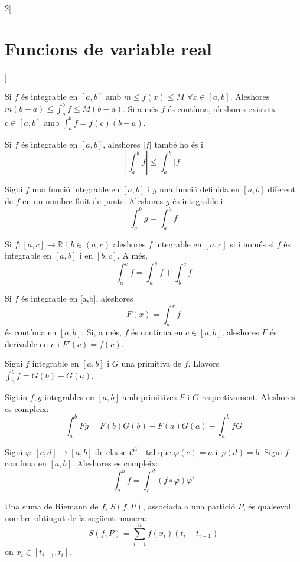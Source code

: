 \documentclass[class=article,10pt,crop=false]{standalone}
\begin{document}
\begin{multicols}{2}[\section{Funcions de variable real}]
\begin{prop}
\end{prop}
\begin{corollary}
Si $f$ és integrable en $[a,b]$ amb $m\leq f(x)\leq M$ $\forall x\in [a,b]$. Aleshores $m(b-a)\leq\int_a^bf\leq M(b-a)$. Si a més $f$ és contínua, aleshores existeix $c\in[a,b]$ amb $\int_a^bf=f(c)(b-a)$.
\end{corollary}
\begin{prop}
Si $f$ és integrable en $[a,b]$, aleshores $|f|$ també ho és i $$\left|\int_a^bf\right|\leq\int_a^b|f|$$
\end{prop}
\begin{prop}
Sigui $f$ una funció integrable en $[a,b]$ i $g$ una funció definida en $[a,b]$ diferent de $f$ en un nombre finit de punts. Aleshores $g$ és integrable i $$\int_a^bg=\int_a^bf$$
\end{prop}
\begin{prop}
Si $f:[a,c]\rightarrow\mathbb{R}$ i $b\in(a,c)$ aleshores $f$ integrable en $[a,c]$ si i només si $f$ és integrable en $[a,b]$ i en $[b,c]$. A més, $$\int_a^cf=\int_a^bf+\int_b^cf$$
\end{prop}
\begin{theorem}
Si $f$ és integrable en [a,b], aleshores $$F(x)=\int_a^xf$$ és contínua en $[a,b]$. Si, a més, $f$ és contínua en $c\in[a,b]$, aleshores $F$ és derivable en $c$ i $F'(c)=f(c)$.
\end{theorem}
\begin{theorem}
Sigui $f$ integrable en $[a,b]$ i $G$ una primitiva de $f$. Llavors $\int_a^bf=G(b)-G(a)$.
\end{theorem}
\begin{corollary}
Siguin $f,g$ integrables en $[a,b]$ amb primitives $F$ i $G$ respectivament. Aleshores es compleix: $$\int_a^bFg=F(b)G(b)-F(a)G(a)-\int_a^bfG$$
\end{corollary}
\begin{corollary}
Sigui $\varphi:[c,d]\rightarrow[a,b]$ de classe $\mathcal{C}^1$ i tal que $\varphi(c)=a$ i $\varphi(d)=b$. Sigui $f$ contínua en $[a,b]$. Aleshores es compleix: $$\int_a^bf=\int_c^d(f\circ\varphi)\varphi'$$
\end{corollary}
\begin{definition}
Una suma de Riemann de $f$, $S(f,P)$, associada a una partició $P$, és qualsevol nombre obtingut de la següent manera: $$S(f,P)=\sum_{i=1}^nf(x_i)(t_i-t_{i-1})$$ on $x_i\in[t_{i-1},t_i]$.
\end{definition}

\end{multicols}
\end{document}

